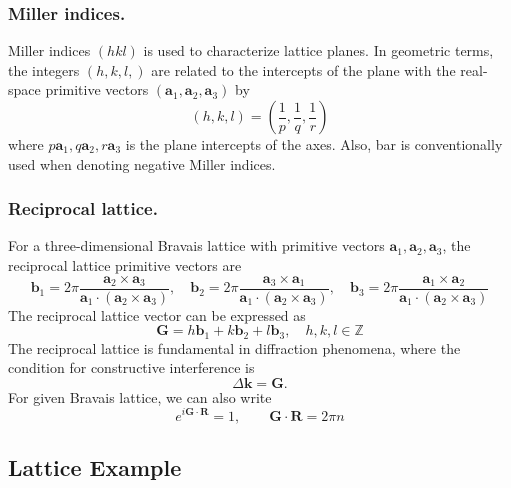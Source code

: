 \documentclass[../../../main.tex]{subfiles}
\begin{document}
\subsubsection{Miller indices.}
Miller indices $(hkl)$ is used to characterize lattice planes.
In geometric terms, the integers $(h,k,l,)$ are related to the intercepts of the plane with the real-space primitive vectors $(\mathbf{a }_1,\mathbf{a }_2,\mathbf{a }_3)$ by
\begin{equation*}
    (h,k,l)=\left( \frac{1 }{p},\frac{1 }{q}, \frac{1 }{r} \right)
\end{equation*}
where $p\mathbf{a }_1,q\mathbf{a }_2,r\mathbf{a }_3$ is the plane intercepts of the axes.
Also, bar is conventionally used when denoting negative Miller indices.

\subsubsection{Reciprocal lattice.}
For a three-dimensional Bravais lattice with primitive vectors $\mathbf{a}_1, \mathbf{a}_2, \mathbf{a}_3$, the reciprocal lattice primitive vectors are
\begin{equation*}
    \mathbf{b}_1 = 2 \pi \frac{\mathbf{a}_2 \times \mathbf{a}_3}{\mathbf{a}_1 \cdot (\mathbf{a}_2 \times \mathbf{a}_3)}, \quad
    \mathbf{b}_2 = 2 \pi \frac{\mathbf{a}_3 \times \mathbf{a}_1}{\mathbf{a}_1 \cdot (\mathbf{a}_2 \times \mathbf{a}_3)}, \quad
    \mathbf{b}_3 = 2 \pi \frac{\mathbf{a}_1 \times \mathbf{a}_2}{\mathbf{a}_1 \cdot (\mathbf{a}_2 \times \mathbf{a}_3)}
\end{equation*}
The reciprocal lattice vector can be expressed as
\begin{equation*}
    \mathbf{G} = h \mathbf{b}_1 + k \mathbf{b}_2 + l \mathbf{b}_3, \quad h, k, l \in \mathbb{Z}
\end{equation*}
The reciprocal lattice is fundamental in diffraction phenomena, where the condition for constructive interference is
\begin{equation*}
    \Delta \mathbf{k} = \mathbf{G}.
\end{equation*}
For given Bravais lattice, we can also write
\begin{equation*}
    e^{i \mathbf{G} \cdot \mathbf{R}} = 1, \qquad
    \mathbf{G} \cdot \mathbf{R} = 2 \pi n
\end{equation*}

\subsection{Lattice Example}
\end{document}
